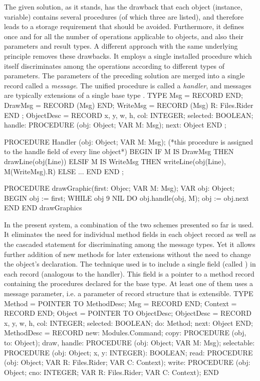 The given solution, as it stands, has the drawback that each object (instance, variable) contains several procedures (of which three are listed), and therefore leads to a storage requirement that should be avoided. Furthermore, it defines once and for all the number of operations applicable to objects, and also their parameters and result types. A different approach with the same underlying principle removes these drawbacks. It employs a single installed procedure which itself discriminates among the operations according to different types of parameters. The parameters of the preceding solution are merged into a single record called a \emph{message}. The unified procedure is called a \emph{handler}, and messages are typically extensions of a single base type .
\begintt
TYPE Msg =      RECORD END;
  DrawMsg =     RECORD (Msg) END;
  WriteMsg =    RECORD (Msg) R: Files.Rider END ;
  ObjectDesc =  RECORD
                  x, y, w, h, col: INTEGER;
                  selected: BOOLEAN;
                  handle: PROCEDURE (obj: Object; VAR M: Msg);
                  next: Object
                END ;

PROCEDURE Handler (obj: Object; VAR M: Msg);
  (*this procedure is assigned to the handle field of every
    line object*)
BEGIN
  IF M IS DrawMsg THEN drawLine(obj(Line))
  ELSIF M IS WriteMsg THEN writeLine(obj(Line), M(WriteMsg).R)
  ELSE ...
  END
END ;

PROCEDURE drawGraphic(first: Objec; VAR M: Msg);
  VAR obj: Object;
BEGIN
  obj := first;
  WHILE obj 9 NIL DO obj.handle(obj, M); obj := obj.next END
END drawGraphics
\endtt

In the present system, a combination of the two schemes presented so far is used. It eliminates the need for individual method fields in each object record as well as the cascaded  statement for discriminating among the message types. Yet it allows further addition of new methods for later extensions without the need to change the object's declaration. The technique used is to include a single field (called ) in each record (analogous to the handler). This field is a pointer to a method record containing the procedures declared for the base type. At least one of them uses a message parameter, i.e. a parameter of record structure that is extensible.
\begintt
TYPE Method =  POINTER TO MethodDesc;
  Msg =        RECORD END;
  Context =    RECORD END;
  Object =     POINTER TO ObjectDesc;
  ObjectDesc = RECORD
                 x, y, w, h, col: INTEGER;
                 selected: BOOLEAN;
                 do: Method;
                 next: Object
               END;
  MethodDesc = RECORD
                 new: Modules.Command;
                 copy: PROCEDURE (obj, to: Object);
                 draw, handle: PROCEDURE (obj: Object;
                                          VAR M: Msg);
                 selectable: PROCEDURE (obj: Object;
                                   x, y: INTEGER): BOOLEAN;
                 read: PROCEDURE (obj: Object;
                                  VAR R: Files.Rider;
                                  VAR C: Context);
                 write: PROCEDURE (obj: Object; cno: INTEGER;
                 VAR R: Files.Rider; VAR C: Context);
               END
\endtt

